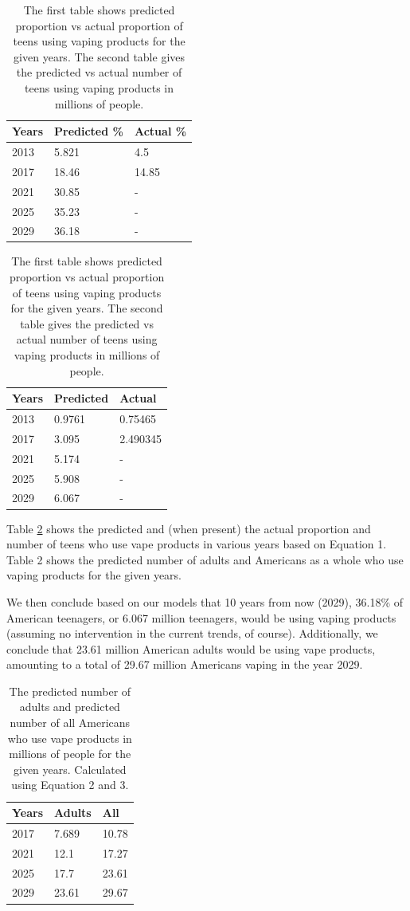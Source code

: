\documentclass[12pt]{article}
\begin{document}
\begin{table}[]

\begin{tabular}{@{}lll@{}}
\toprule
Years & Predicted \% & Actual \% \\ \midrule
2013  & 5.821        & 4.5       \\
2017  & 18.46        & 14.85     \\
2021  & 30.85        & -         \\
2025  & 35.23        & -         \\
2029  & 36.18        & -         \\ \bottomrule
\end{tabular}
\quad
\begin{tabular}{@{}lll@{}}
\toprule
Years & Predicted & Actual   \\ \midrule
2013  & 0.9761    & 0.75465  \\
2017  & 3.095     & 2.490345 \\
2021  & 5.174     & -        \\
2025  & 5.908     & -        \\
2029  & 6.067     & -        \\ \bottomrule
\end{tabular}
\caption{The first table shows predicted proportion vs actual proportion of teens using vaping products for the given years. The second table gives the predicted vs actual number of teens using vaping products in millions of people.}
\label{table:teenUsage}
\end{table}

Table \ref{table:teenUsage} shows the predicted and (when present) the actual proportion and number of teens who use vape products in various years based on Equation 1. Table 2 shows the predicted number of adults and Americans as a whole who use vaping products for the given years.

We then conclude based on our models that 10 years from now (2029), 36.18\% of American teenagers, or 6.067 million teenagers, would be using vaping products (assuming no intervention in the current trends, of course). Additionally, we conclude that 23.61 million American adults would be using vape products, amounting to a total of 29.67 million Americans vaping in the year 2029.

\begin{table}[]
\begin{tabular}{@{}lll@{}}
\toprule
Years & Adults & All   \\ \midrule
2017  & 7.689  & 10.78 \\
2021  & 12.1   & 17.27 \\
2025  & 17.7   & 23.61 \\
2029  & 23.61  & 29.67 \\ \bottomrule
\end{tabular}
\caption{The predicted number of adults and predicted number of all Americans who use vape products in millions of people for the given years. Calculated using Equation 2 and 3.}
\end{table}
\end{document}
